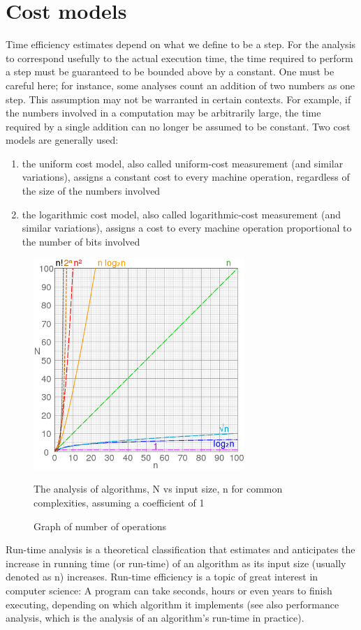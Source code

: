 \documentclass[openany,a4paper,12pt]{book}
\begin{document}
\section{Cost models}
Time efficiency estimates depend on what we define to be a step. For the analysis to correspond usefully to the actual execution time, the time required to perform a step must be guaranteed to be bounded above by a constant. One must be careful here; for instance, some analyses count an addition of two numbers as one step. This assumption may not be warranted in certain contexts. For example, if the numbers involved in a computation may be arbitrarily large, the time required by a single addition can no longer be assumed to be constant.
\newline \newline
Two cost models are generally used:
\begin{enumerate}
\item 
the uniform cost model, also called uniform-cost measurement (and similar variations), assigns a constant cost to every machine operation, regardless of the size of the numbers involved
\item
the logarithmic cost model, also called logarithmic-cost measurement (and similar variations), assigns a cost to every machine operation proportional to the number of bits involved \cite{Abedon94}
\end{enumerate}
\begin{center}

\begin{figure}[ht]
\begin{center}
\includegraphics[width=8cm]{picture2.png} \caption{Graph of number of operations}{The analysis of algorithms, N vs input size, n for common complexities, assuming a coefficient of 1} \label{rys2}
\end{center}
\end{figure}
\end{center}
Run-time analysis is a theoretical classification that estimates and anticipates the increase in running time (or run-time) of an algorithm as its input size (usually denoted as n) increases. Run-time efficiency is a topic of great interest in computer science: A program can take seconds, hours or even years to finish executing, depending on which algorithm it implements (see also performance analysis, which is the analysis of an algorithm's run-time in practice).\cite{goossens93}
\end{document}

